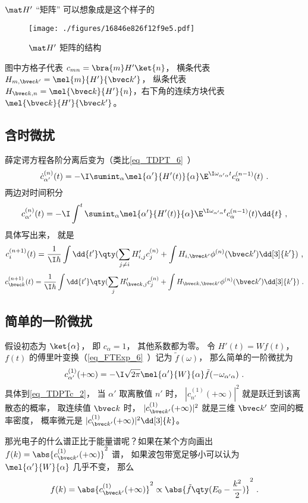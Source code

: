 $\mat H'$  “矩阵” 可以想象成是这个样子的
\begin{figure}[ht]
\centering
\texttt{[image: ./figures/16846e826f12f9e5.pdf]}
\caption{$\mat H'$ 矩阵的结构} \label{fig_TDPTc_1}
\end{figure}
图中方格子代表 $c_{mn} = \bra{m} H' \ket{n}$， 横条代表 $H_{m,\bvec k'} = \mel{m}{H'}{\bvec k'}$，  纵条代表 $H_{\bvec k, n} = \mel{\bvec k}{H'}{n}$，右下角的连续方块代表 $\mel{\bvec k}{H'}{\bvec k'}$。

\subsection{含时微扰}
薛定谔方程各阶分离后变为（类比\autoref{eq_TDPT_6}~）
\begin{equation}
\dot c_{\alpha'}^{(n)}(t) = -\I \sumint_\alpha \mel{\alpha'}{H'(t)}{\alpha} \E^{\I \omega_{\alpha'\alpha} t} c_{\alpha}^{(n-1)}(t)~.
\end{equation}
两边对时间积分
\begin{equation}
c_{\alpha'}^{(n)}(t) = -\I \int^t \sumint_\alpha \mel{\alpha'}{H'(t)}{\alpha} \E^{\I \omega_{\alpha'\alpha} t} c_{\alpha}^{(n-1)}(t) \dd{t}~,
\end{equation}
具体写出来， 就是
\begin{equation}
c_i^{(n + 1)}(t) = \frac{1}{\I\hbar} \int \dd{t'} \qty(\sum_{j \ne i} H'_{i,j} c_j^{(n)} + \int H_{i,\bvec k'} \phi ^{(n)}(\bvec k') \dd[3]{k'} )~,
\end{equation}
\begin{equation}
c^{(n+1)}_{\bvec k}(t) = \frac{1}{\I\hbar} \int \dd{t'} \qty(\sum_j H'_{\bvec k,j} c_j^{(n)} + \int H_{\bvec k,\bvec k'} \phi ^{(n)}(\bvec k') \dd[3]{k'})~.
\end{equation}

\subsection{简单的一阶微扰}
假设初态为 $\ket{\alpha}$， 即 $c_\alpha = 1$， 其他系数都为零。 令 $H'(t) = W f(t)$， $f(t)$ 的傅里叶变换（\autoref{eq_FTExp_6}~）记为 $\tilde f(\omega)$， 那么简单的一阶微扰为
\begin{equation}\label{eq_TDPTc_1}
c_{\alpha'}^{(1)}(+\infty) = -\I\sqrt{2\pi} \mel{\alpha'}{W}{\alpha} \tilde f(-\omega_{\alpha'\alpha})~.
\end{equation}
具体到\autoref{eq_TDPTc_2}， 当 $\alpha'$ 取离散值 $n'$ 时， $|c_{n'}^{(1)}(+\infty)|^2$ 就是跃迁到该离散态的概率， 取连续值 $\bvec k$ 时， $|c_{\bvec k'}^{(1)}(+\infty)|^2$ 就是三维 $\bvec k'$ 空间的概率密度， 概率微元是 $|c_{\bvec k'}^{(1)}(+\infty)|^2\dd[3]{k}$。


那光电子的什么谱正比于能量谱呢？如果在某个方向画出 $f(k) = \abs{c_{\bvec k'}^{(1)}(+\infty)}^2$ 谱， 如果波包带宽足够小可以认为 $\mel{\alpha'}{W}{\alpha}$ 几乎不变， 那么
\begin{equation}
f(k) = \abs{c_{\bvec k'}^{(1)}(+\infty)}^2 \propto \abs{\tilde f\qty(E_0-\frac{k^2}{2})}^2~.
\end{equation}

